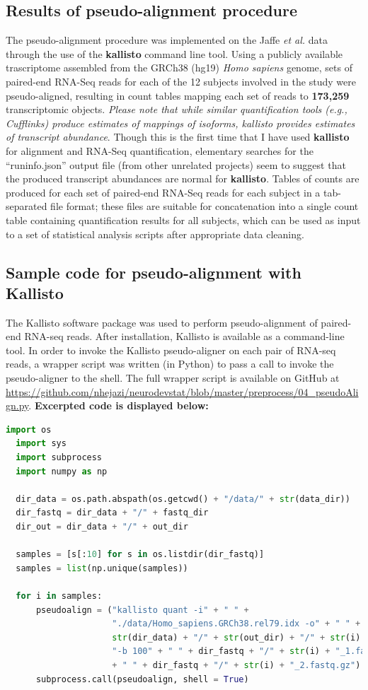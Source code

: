 \documentclass[11pt]{article}
\begin{document}
\subsection{Results of pseudo-alignment procedure}
The pseudo-alignment procedure was implemented on the Jaffe \textit{et al.} data
through the use of the \textbf{kallisto} command line tool. Using a publicly
available trascriptome assembled from the GRCh38 (hg19) \textit{Homo sapiens}
genome, sets of paired-end RNA-Seq reads for each of the 12 subjects involved in
the study were pseudo-aligned, resulting in count tables mapping each set of
reads to \textbf{173,259} transcriptomic objects. \textit{Please note that while
similar quantification tools (e.g., Cufflinks) produce estimates of mappings of
isoforms, kallisto provides estimates of transcript abundance}. Though this is
the first time that I have used \textbf{kallisto} for alignment and RNA-Seq
quantification, elementary searches for the ``run\textunderscore info.json''
output file (from other unrelated projects) seem to suggest that the produced
transcript abundances are normal for \textbf{kallisto}. Tables of counts are
produced for each set of paired-end RNA-Seq reads for each subject in a
tab-separated file format; these files are suitable for concatenation into a
single count table containing quantification results for all subjects, which can
be used as input to a set of statistical analysis scripts after appropriate data
cleaning.


\subsection{Sample code for pseudo-alignment with Kallisto}
The Kallisto software package was used to perform pseudo-alignment of paired-end
RNA-seq reads. After installation, Kallisto is available as a command-line tool.
In order to invoke the Kallisto pseudo-aligner on each pair of RNA-seq reads, a
wrapper script was written (in Python) to pass a call to invoke the
pseudo-aligner to the shell. The full wrapper script is available on GitHub at
\url{https://github.com/nhejazi/neurodevstat/blob/master/preprocess/04_pseudoAlign.py}.
\textbf{Excerpted code is displayed below:}

\begin{lstlisting}[language=Python]
  import os
  import sys
  import subprocess
  import numpy as np

  dir_data = os.path.abspath(os.getcwd() + "/data/" + str(data_dir))
  dir_fastq = dir_data + "/" + fastq_dir
  dir_out = dir_data + "/" + out_dir

  samples = [s[:10] for s in os.listdir(dir_fastq)]
  samples = list(np.unique(samples))

  for i in samples:
      pseudoalign = ("kallisto quant -i" + " " +
                     "./data/Homo_sapiens.GRCh38.rel79.idx -o" + " " +
                     str(dir_data) + "/" + str(out_dir) + "/" + str(i) + " " +
                     "-b 100" + " " + dir_fastq + "/" + str(i) + "_1.fastq.gz"
                     + " " + dir_fastq + "/" + str(i) + "_2.fastq.gz")
      subprocess.call(pseudoalign, shell = True)
\end{lstlisting}
\end{document}
